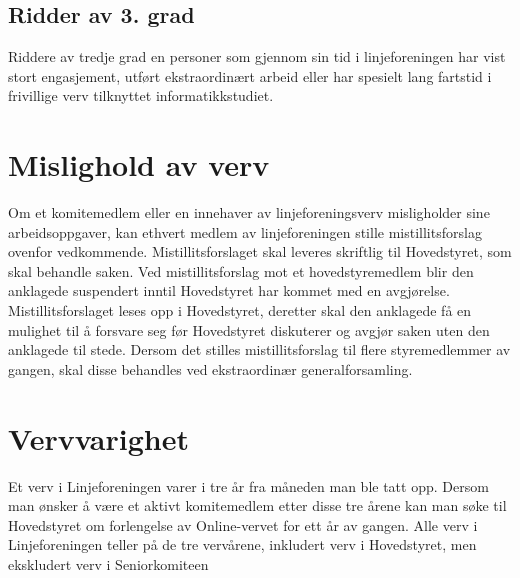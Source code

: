 \subsection{Ridder av 3. grad}

Riddere av tredje grad en personer som gjennom sin tid i linjeforeningen har vist stort engasjement, utført ekstraordinært arbeid eller har spesielt lang fartstid i frivillige verv tilknyttet informatikkstudiet.


\section{Mislighold av verv}
Om et komitemedlem eller en innehaver av linjeforeningsverv misligholder sine arbeidsoppgaver, kan ethvert medlem av linjeforeningen stille mistillitsforslag ovenfor vedkommende. Mistillitsforslaget skal leveres skriftlig til Hovedstyret, som skal behandle saken. Ved mistillitsforslag mot et hovedstyremedlem blir den anklagede suspendert inntil Hovedstyret har kommet med en avgjørelse. Mistillitsforslaget leses opp i Hovedstyret, deretter skal den anklagede få en mulighet til å forsvare seg før Hovedstyret diskuterer og avgjør saken uten den anklagede til stede. Dersom det stilles mistillitsforslag til flere styremedlemmer av gangen, skal disse behandles ved ekstraordinær generalforsamling.


\section{Vervvarighet}
Et verv i Linjeforeningen varer i tre år fra måneden man ble tatt opp. Dersom man ønsker å være et aktivt komitemedlem etter disse tre årene kan man søke til Hovedstyret om forlengelse av Online-vervet for ett år av gangen. Alle verv i Linjeforeningen teller på de tre vervårene, inkludert verv i Hovedstyret, men ekskludert verv i Seniorkomiteen

\newpage
